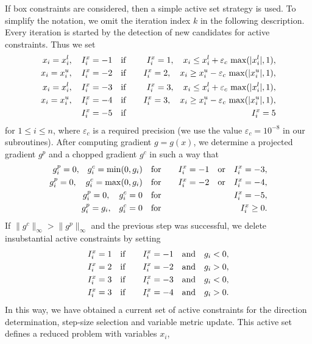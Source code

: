 \documentclass{esub2acm}
\newcommand{\beq}{\begin{eqnarray*}}
\newcommand{\eeq}{\end{eqnarray*}}
\begin{document}
If box constraints are considered, then a simple active set strategy
is used. To simplify the notation, we omit the iteration index $k$ in the
following description. Every iteration is started by the detection of
new candidates for active constraints. Thus we set
%
\beq
x_i = x^l_i,  \quad I^x_i = -1 \quad & {\rm if } & \quad
I^x_i = 1, \quad x_i \leq x^l_i + \varepsilon_c \, \max(|x^l_i|, 1), \\
x_i = x^u_i,  \quad I^x_i = -2 \quad & {\rm if } & \quad
I^x_i = 2, \quad x_i \geq x^u_i - \varepsilon_c \, \max(|x^u_i|, 1), \\
x_i = x^l_i,  \quad I^x_i = -3 \quad & {\rm if } & \quad
I^x_i = 3, \quad x_i \leq x^l_i + \varepsilon_c \, \max(|x^l_i|, 1), \\
x_i = x^u_i,  \quad I^x_i = -4 \quad & {\rm if } & \quad
I^x_i = 3, \quad x_i \geq x^u_i - \varepsilon_c \, \max(|x^u_i|, 1), \\
                    I^x_i = -5 \quad & {\rm if } & \quad
I^x_i = 5 \eeq
%
for $1 \leq i \leq n$, where $\varepsilon_c$ is a required precision (we use
the value $\varepsilon_c = 10^{-8}$ in our subroutines). After computing gradient
$g = g(x)$, we determine a projected gradient $g^p$ and a chopped gradient $g^c$
in such a way that %
%
\beq
g^p_i = 0, \! \quad g^c_i = \min(0, g_i) \quad  & {\rm for} & \quad
I^x_i = -1 \quad {\rm or} \quad I^x_i = -3, \\
g^p_i = 0, \quad g^c_i = \max(0, g_i) \quad  & {\rm for} & \quad
I^x_i = -2 \quad {\rm or} \quad I^x_i = -4, \\
g^p_i = 0,  \quad g^c_i = 0 \quad & {\rm for} & \quad I^x_i = -5, \\
g^p_i = g_i, \! \quad g^c_i = 0 \quad  & {\rm for} & \quad I^x_i \geq 0.
\eeq
%
If $\|g^c\|_{\infty} > \|g^p\|_{\infty}$ and the previous step was
successful, we delete insubstantial active constraints by setting
%
\beq
I^x_i = 1 \quad & {\rm if } & \quad I^x_i = -1 \quad {\rm and} \quad g_i < 0, \\
I^x_i = 2 \quad & {\rm if } & \quad I^x_i = -2 \quad {\rm and} \quad g_i > 0, \\
I^x_i = 3 \quad & {\rm if } & \quad I^x_i = -3 \quad {\rm and} \quad g_i < 0, \\
I^x_i = 3 \quad & {\rm if } & \quad I^x_i = -4 \quad {\rm and} \quad g_i > 0.
\eeq
%
In this way, we have obtained a current set of active constraints for
the direction determination, step-size selection and variable metric
update. This active set defines a reduced problem with variables $x_i$,
\end{document}
